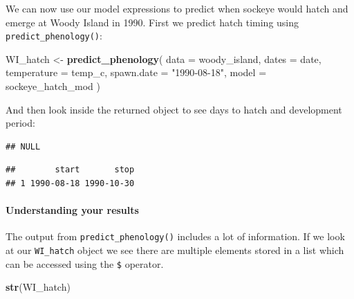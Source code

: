 \documentclass[10pt,a4paper,onecolumn]{article}
\let\oldparagraph\paragraph
\renewcommand{\paragraph}[1]{\oldparagraph{#1}\mbox{}}
\newenvironment{Shaded}{\begin{snugshade}}{\end{snugshade}}
\newcommand{\AttributeTok}[1]{\textcolor[rgb]{0.13,0.29,0.53}{#1}}
\newcommand{\FunctionTok}[1]{\textcolor[rgb]{0.13,0.29,0.53}{\textbf{#1}}}
\newcommand{\NormalTok}[1]{#1}
\newcommand{\OtherTok}[1]{\textcolor[rgb]{0.56,0.35,0.01}{#1}}
\newcommand{\SpecialCharTok}[1]{\textcolor[rgb]{0.81,0.36,0.00}{\textbf{#1}}}
\newcommand{\StringTok}[1]{\textcolor[rgb]{0.31,0.60,0.02}{#1}}
\begin{document}
We can now use our model expressions to predict when sockeye would hatch
and emerge at Woody Island in 1990. First we predict hatch timing using
\texttt{predict\_phenology()}:

\begin{Shaded}
\begin{Highlighting}[]
\NormalTok{WI\_hatch }\OtherTok{\textless{}{-}} \FunctionTok{predict\_phenology}\NormalTok{(}
  \AttributeTok{data =}\NormalTok{ woody\_island,}
  \AttributeTok{dates =}\NormalTok{ date,}
  \AttributeTok{temperature =}\NormalTok{ temp\_c,}
  \AttributeTok{spawn.date =} \StringTok{"1990{-}08{-}18"}\NormalTok{,}
  \AttributeTok{model =}\NormalTok{ sockeye\_hatch\_mod}
\NormalTok{  )}
\end{Highlighting}
\end{Shaded}

And then look inside the returned object to see days to hatch and
development period:

\begin{Shaded}
\end{Shaded}

\begin{verbatim}
## NULL
\end{verbatim}

\begin{Shaded}
\end{Shaded}

\begin{verbatim}
##        start       stop
## 1 1990-08-18 1990-10-30
\end{verbatim}

\paragraph{Understanding your results}\label{understanding-your-results}

The output from \texttt{predict\_phenology()} includes a lot of
information. If we look at our \texttt{WI\_hatch} object we see there
are multiple elements stored in a list which can be accessed using the
\texttt{\$} operator.

\begin{Shaded}
\begin{Highlighting}[]
\FunctionTok{str}\NormalTok{(WI\_hatch)}
\end{Highlighting}
\end{Shaded}
\end{document}
